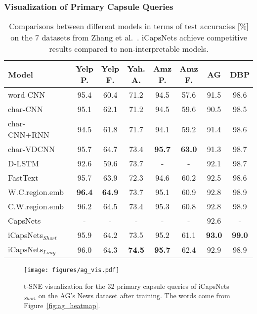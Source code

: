 \documentclass[10pt,journal,compsoc]{IEEEtran}
\begin{document}
\subsubsection{Visualization of Primary Capsule Queries}\label{sec:visualization}

\begin{table*}[t]
	\caption{Comparisons between different models in terms of test accuracies [\%] on the 7 datasets from Zhang et al.~\cite{zhang2015character}. iCapsNets achieve competitive results compared to non-interpretable models.}
	\begin{center}
		\tabcolsep=0.5cm\begin{tabular}{l|ccccccc}
			Model & Yelp P. & Yelp F. & Yah. A. & Amz P. & Amz F. & AG & DBP \\
			\hline
			word-CNN~\cite{zhang2015character} & 95.4 & 60.4 & 71.2 & 94.5 & 57.6 & 91.5 & 98.6 \\
			char-CNN~\cite{zhang2015character} & 95.1 & 62.1 & 71.2 & 94.5 & 59.6 & 90.5 & 98.5 \\
			char-CNN+RNN~\cite{xiao2016efficient} & 94.5 & 61.8 & 71.7 & 94.1 & 59.2 & 91.4 & 98.6 \\
			char-VDCNN~\cite{conneau2017very} & 95.7 & 64.7 & 73.4 & \textbf{95.7} & \textbf{63.0} & 91.3 & 98.7 \\
			D-LSTM~\cite{yogatama2017generative} & 92.6 & 59.6 & 73.7 & - & - & 92.1 & 98.7 \\
			\hline
			FastText~\cite{joulin2017bag} & 95.7 & 63.9 & 72.3 & 94.6 & 60.2 & 92.5 & 98.6 \\
			W.C.region.emb~\cite{qiao2018a} & \textbf{96.4} & \textbf{64.9} & 73.7 & 95.1 & 60.9 & 92.8 & 98.9 \\
			C.W.region.emb~\cite{qiao2018a} & 96.2 & 64.5 & 73.4 & 95.3 & 60.8 & 92.8 & 98.9 \\
			\hline
			CapsNets~\cite{yang2018investigating} & - & - & - & - & - & 92.6 & - \\
			\hline
			iCapsNets$_{Short}$ & 95.9 & 64.2 & 73.5 & 95.2 & 61.1 & \textbf{93.0} & \textbf{99.0} \\
			iCapsNets$_{Long}$ & 96.0 & 64.3 & \textbf{74.5} & \textbf{95.7} & 62.4 & 92.9 & 98.9 \\
		\end{tabular}
		\label{table:result}
	\end{center}
\end{table*}

\begin{figure}[t]
	\centering
	\texttt{[image: figures/ag\_vis.pdf]}
	\caption{t-SNE visualization for the 32 primary capsule queries of iCapsNets$_{Short}$ on the AG's News dataset after training. The words come from Figure~\ref{fig:ag_heatmap}.}
	\label{fig:ag_vis}
\end{figure}
\end{document}
